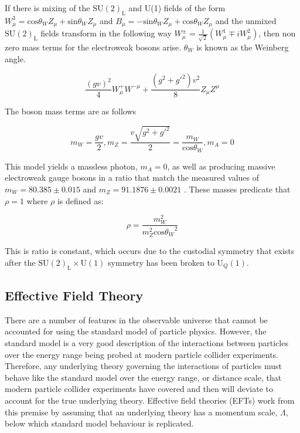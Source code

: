 If there is mixing of the $\text{SU}(2)_{\text{L}}$ and U(1) fields of the form $W^{3}_{\mu} = \text{cos}{\theta_{W}}Z_{\mu} + \text{sin}{\theta_{W}}Z_{\mu}$ and $B_{\mu} = -\text{sin}{\theta_{W}}Z_{\mu} + \text{cos}{\theta_{W}}Z_{\mu}$ and the unmixed $\text{SU}(2)_{\text{L}}$ fields transform in the following way $W^{\pm}_{\mu} = \frac{1}{\sqrt{2}}(W^{1}_{\mu} \mp i W^{2}_{\mu})$, then non zero mass terms for the electroweak bosons arise.  $\theta_{W}$ is known as the Weinberg angle.

\begin{equation}
\frac{(gv)^{2}}{4} W^{+}_{\mu} W^{-\mu} + \frac{(g^{2} + g'^{2})v^{2}}{8} Z_{\mu} Z^{\mu}
\end{equation}

The boson mass terms are as follows

\begin{equation}
m_{W} = \frac{gv}{2}, m_{Z} = \frac{v\sqrt{g^{2} + g'^{2}}}{2} = \frac{m_{W}}{\text{cos}{\theta_{W}}}, m_{A} = 0
\end{equation}

This model yields a massless photon, $m_{A} = 0$, as well as producing massive electroweak gauge bosons in a ratio that match the measured values of $m_{W} = 80.385 \pm 0.015$ and $m_{Z} = 91.1876 \pm 0.0021$ \cite{Beringer:1900zz}.  These masses predicate that $\rho = 1$ where $\rho$ is defined as:

\begin{equation}
\rho = \frac{m_{W}^{2}}{m_{Z}^{2}\text{cos}{\theta_{W}}^{2}}
\end{equation}

This is ratio is constant, which occurs due to the custodial symmetry that exists after the $\text{SU}(2)_{\text{L}} \times \text{U}(1)$ symmetry has been broken to $\text{U}_{Q}(1)$.

\subsection{Effective Field Theory}
There are a number of features in the observable universe that cannot be accounted for using the standard model of particle physics.  However, the standard model is a very good description of the interactions between particles over the energy range being probed at modern particle collider experiments.  Therefore, any underlying theory governing the interactions of particles must behave like the standard model over the energy range, or distance scale, that modern particle collider experiments have covered and then will deviate to account for the true underlying theory.  Effective field theories (EFTs) work from this premise by assuming that an underlying theory has a momentum scale, $\Lambda$, below which standard model behaviour is replicated.  

